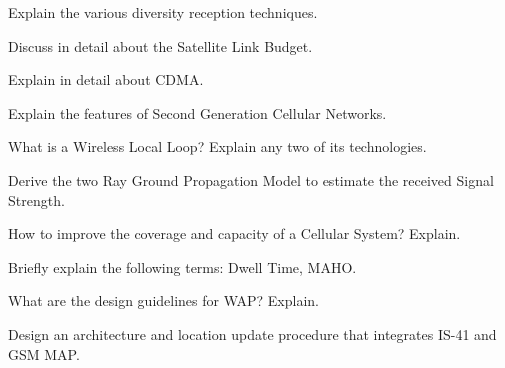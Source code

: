 \markB
\partC

\item Explain the various diversity reception techniques.
\Or
\item Discuss in detail about the Satellite Link Budget.

\newpage \again

\item Explain in detail about CDMA.
\Or
\item \iitem Explain the features of Second Generation Cellular Networks. 
\item What is a Wireless Local Loop? Explain any two of its technologies.  
\ene

\item Derive the two Ray Ground Propagation Model to estimate the received Signal Strength.
\Or
\item \iitem How to improve the coverage and capacity of a Cellular System? Explain.  
\item Briefly explain the following terms: Dwell Time, MAHO.  
\ene

\item What are the design guidelines for WAP? Explain.
\Or
\item Design an architecture and location update procedure that integrates IS-41 and GSM MAP.

\markC
\ene
